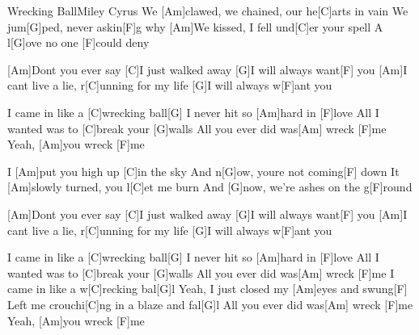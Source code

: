 \documentclass[../main.tex]{subfiles}
\begin{document}
\begin{song}[2]{Wrecking Ball}{Miley Cyrus}{}
We [Am]clawed, we chained, our he[C]arts in vain
We jum[G]ped, never askin[F]g why
[Am]We kissed, I fell und[C]er your spell
A l[G]ove no one [F]could deny

[Am]Dont you ever say [C]I just walked away
[G]I will always want[F] you
[Am]I cant live a lie, r[C]unning for my life
[G]I will always w[F]ant you

I came in like a [C]wrecking ball[G]{\hh}
I never hit so [Am]hard in [F]love
All I wanted was to [C]break your [G]walls
All you ever did was[Am] wreck [F]me
Yeah, [Am]you wreck [F]me

I [Am]put you high up [C]in the sky
And n[G]ow, youre not coming[F] down
It [Am]slowly turned, you l[C]et me burn
And [G]now, we’re ashes on the g[F]round

[Am]Dont you ever say [C]I just walked away
[G]I will always want[F] you
[Am]I cant live a lie, r[C]unning for my life
[G]I will always w[F]ant you

I came in like a [C]wrecking ball[G]{\hh}
I never hit so [Am]hard in [F]love
All I wanted was to [C]break your [G]walls
All you ever did was[Am] wreck [F]me
I came in like a w[C]recking bal[G]l
Yeah, I just closed my [Am]eyes and swung[F]{\hh}
Left me crouchi[C]ng in a blaze and fal[G]l
All you ever did was[Am] wreck [F]me
Yeah, [Am]you wreck [F]me

\end{song}
\end{document}
